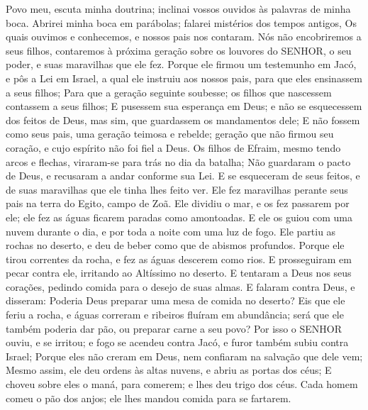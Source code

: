 {\PP 
  Povo meu, escuta minha doutrina; inclinai vossos ouvidos às palavras de minha boca.
  Abrirei minha boca em parábolas; falarei mistérios dos tempos antigos,
  Os quais ouvimos e conhecemos, e nossos pais nos contaram.
  Nós não
{} encobriremos a seus filhos, contaremos à próxima geração sobre os louvores do SENHOR, o seu poder, e suas maravilhas que ele fez.
  Porque ele firmou um testemunho em Jacó, e pôs a Lei em Israel, a qual ele instruiu aos nossos pais, para que eles ensinassem a seus filhos;
  Para que a geração seguinte
{} soubesse;
{} os filhos que nascessem contassem a seus filhos;
  E
{} pusessem sua esperança em Deus; e não se esquecessem dos feitos de Deus, mas sim, que guardassem os mandamentos dele;
  E não fossem como seus pais,
{} uma geração teimosa e rebelde; geração que não firmou seu coração, e cujo espírito não foi fiel a Deus.
  Os filhos de Efraim, mesmo tendo arcos e flechas, viraram-se para trás no dia da batalha;
  Não guardaram o pacto de Deus, e recusaram a andar conforme sua Lei.
  E se esqueceram de seus feitos, e de suas maravilhas que ele tinha lhes feito ver.
  Ele fez maravilhas perante seus pais na terra do Egito,
{} campo de Zoã.
  Ele dividiu o mar, e os fez passarem por ele; ele fez as águas ficarem paradas como
{} amontoadas.
  E ele os guiou com uma nuvem durante o dia, e por toda a noite com uma luz de fogo.
  Ele partiu as rochas no deserto, e
{} deu de beber como que de abismos profundos.
  Porque ele tirou correntes da rocha, e fez as águas descerem como rios.
  E
{} prosseguiram em pecar contra ele, irritando ao Altíssimo no deserto.
  E tentaram a Deus nos seus corações, pedindo comida para o desejo de suas almas.
  E falaram contra Deus, e disseram: Poderia Deus preparar uma mesa de comida no deserto?
  Eis que ele feriu a rocha, e águas correram
{} e ribeiros fluíram em abundância; será que ele também poderia
{} dar pão, ou preparar carne a seu povo?
  Por isso o SENHOR
{} ouviu, e se irritou; e fogo se acendeu contra Jacó, e furor também subiu contra Israel;
  Porque eles não creram em Deus, nem confiaram na salvação que dele vem;
  Mesmo assim, ele deu ordens às altas nuvens, e abriu as portas dos céus;
  E choveu sobre eles o maná, para comerem; e lhes deu trigo dos céus.
  Cada homem
{} comeu o pão dos anjos; ele lhes mandou comida para se fartarem.
}
